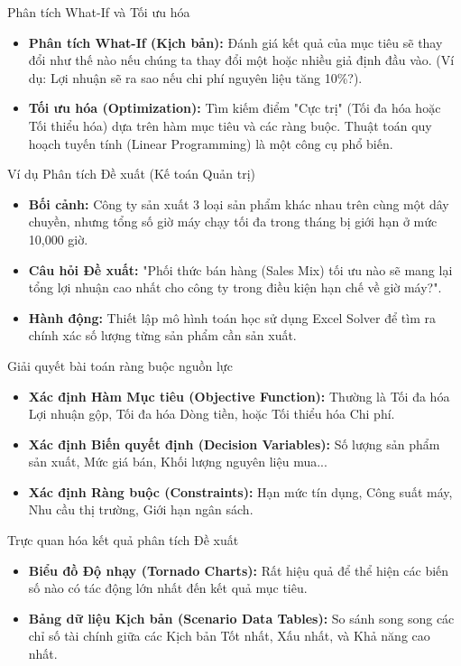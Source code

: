 \documentclass[aspectratio=169,12pt]{beamer}
\begin{document}
\begin{frame}{Phân tích What-If và Tối ưu hóa}
\begin{itemize}
    \item \textbf{Phân tích What-If (Kịch bản):} Đánh giá kết quả của mục tiêu sẽ thay đổi như thế nào nếu chúng ta thay đổi một hoặc nhiều giả định đầu vào. (Ví dụ: Lợi nhuận sẽ ra sao nếu chi phí nguyên liệu tăng 10\%?).
    \item \textbf{Tối ưu hóa (Optimization):} Tìm kiếm điểm "Cực trị" (Tối đa hóa hoặc Tối thiểu hóa) dựa trên hàm mục tiêu và các ràng buộc. Thuật toán quy hoạch tuyến tính (Linear Programming) là một công cụ phổ biến.
\end{itemize}
\end{frame}

\begin{frame}{Ví dụ Phân tích Đề xuất (Kế toán Quản trị)}
\begin{itemize}
    \item \textbf{Bối cảnh:} Công ty sản xuất 3 loại sản phẩm khác nhau trên cùng một dây chuyền, nhưng tổng số giờ máy chạy tối đa trong tháng bị giới hạn ở mức 10,000 giờ.
    \item \textbf{Câu hỏi Đề xuất:} "Phối thức bán hàng (Sales Mix) tối ưu nào sẽ mang lại tổng lợi nhuận cao nhất cho công ty trong điều kiện hạn chế về giờ máy?".
    \item \textbf{Hành động:} Thiết lập mô hình toán học sử dụng Excel Solver để tìm ra chính xác số lượng từng sản phẩm cần sản xuất.
\end{itemize}
\end{frame}

\begin{frame}{Giải quyết bài toán ràng buộc nguồn lực}
\begin{itemize}
    \item \textbf{Xác định Hàm Mục tiêu (Objective Function):} Thường là Tối đa hóa Lợi nhuận gộp, Tối đa hóa Dòng tiền, hoặc Tối thiểu hóa Chi phí.
    \item \textbf{Xác định Biến quyết định (Decision Variables):} Số lượng sản phẩm sản xuất, Mức giá bán, Khối lượng nguyên liệu mua...
    \item \textbf{Xác định Ràng buộc (Constraints):} Hạn mức tín dụng, Công suất máy, Nhu cầu thị trường, Giới hạn ngân sách.
\end{itemize}
\end{frame}

\begin{frame}{Trực quan hóa kết quả phân tích Đề xuất}
\begin{itemize}
    \item \textbf{Biểu đồ Độ nhạy (Tornado Charts):} Rất hiệu quả để thể hiện các biến số nào có tác động lớn nhất đến kết quả mục tiêu.
    \item \textbf{Bảng dữ liệu Kịch bản (Scenario Data Tables):} So sánh song song các chỉ số tài chính giữa các Kịch bản Tốt nhất, Xấu nhất, và Khả năng cao nhất.
\end{itemize}
\end{frame}
\end{document}
